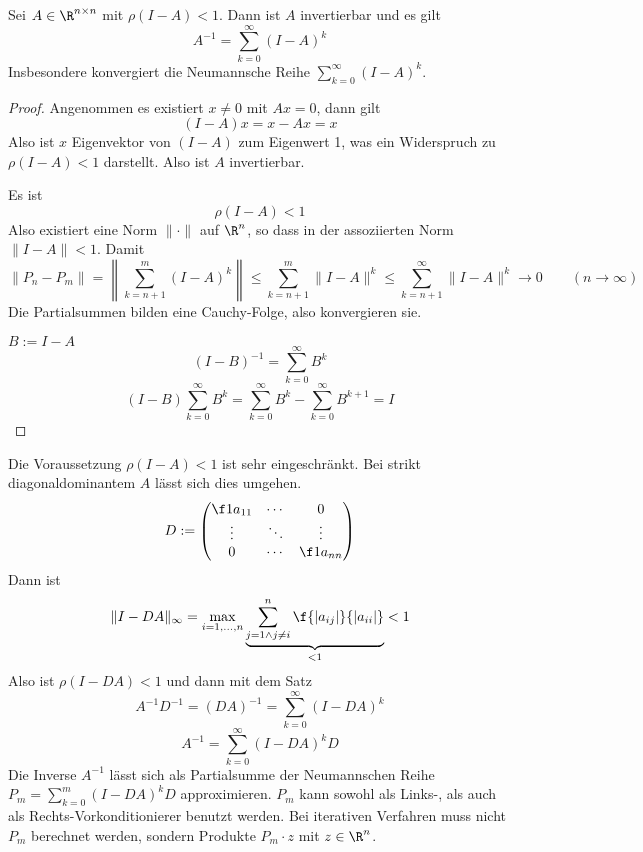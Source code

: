\documentclass[a4paper]{scrartcl}
\numberwithin{equation}{section}
\begin{document}
\begin{st}
	\label{st:6.4}
	Sei $A\in \R^{n\times n}$ mit $\rho(I-A)<1$.
	Dann ist $A$ invertierbar und es gilt
	\[
		A^{-1} = \sum_{k=0}^\infty (I-A)^k
	\]
	Insbesondere konvergiert die Neumannsche Reihe $\sum_{k=0}^\infty (I-A)^k$.
	\begin{proof}
		Angenommen es existiert $x\neq 0$ mit $Ax=0$, dann gilt
		\[
			(I-A)x = x-Ax = x
		\]
		Also ist $x$ Eigenvektor von $(I-A)$ zum Eigenwert 1, was ein Widerspruch zu $\rho(I-A)<1$ darstellt.
		Also ist $A$ invertierbar.

		Es ist
		\[
			\rho(I-A) < 1
		\]
		Also existiert eine Norm $\|\cdot\|$ auf $\R^n$, so dass in der assoziierten Norm $\|I-A\| < 1$.
		Damit
		\[
			\|P_n - P_m\| = \left\|\sum_{k=n+1}^m(I-A)^k\right\| \le  \sum_{k=n+1}^m\|I-A\|^k \le \sum_{k=n+1}^\infty \|I-A\|^k \to 0 \qquad (n\to \infty)
		\]
		Die Partialsummen bilden eine Cauchy-Folge, also konvergieren sie.

		$B:= I-A$
		\[
			(I-B)^{-1} = \sum_{k=0}^\infty B^k
		\]
		\[
			(I-B)\sum_{k=0}^\infty B^k = \sum_{k=0}^\infty B^k - \sum_{k=0}^\infty B^{k+1} = I
		\]
	\end{proof}
	\begin{note}
		Die Voraussetzung $\rho(I-A)<1$ ist sehr eingeschränkt.
		Bei strikt diagonaldominantem $A$ lässt sich dies umgehen.
		\[
			D := \begin{pmatrix}\f 1{a_{11}} & \cdots & 0 \\ \vdots & \ddots & \vdots \\ 0 & \cdots & \f 1{a_{nn}}\end{pmatrix}
		\]
		Dann ist
		\[
			\|I - DA\|_\infty = \max_{i=1,\dotsc, n} \underbrace{\sum_{j=1\land j\neq i}^n \f{|a_{ij}|}{|a_{ii}|}}_{<1} < 1
		\]
		Also ist $\rho(I-DA) < 1$ und dann mit dem Satz
		\[
			A^{-1}D^{-1} = (DA)^{-1} = \sum_{k=0}^\infty (I-DA)^k
		\]
		\[
			A^{-1} = \sum_{k=0}^\infty (I-DA)^k D
		\]
		Die Inverse $A^{-1}$ lässt sich als Partialsumme der Neumannschen Reihe $P_m = \sum_{k=0}^m(I-DA)^kD$ approximieren.
		$P_m$ kann sowohl als Links-, als auch als Rechts-Vorkonditionierer benutzt werden.
		Bei iterativen Verfahren muss nicht $P_m$ berechnet werden, sondern Produkte $P_m\cdot z$ mit $z\in \R^n$. 
	\end{note}
\end{st}
\end{document}
